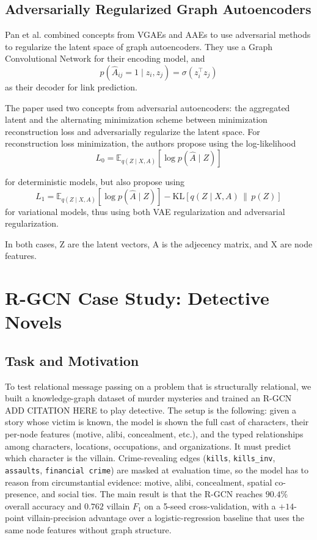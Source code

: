 \documentclass[11pt]{article}
\begin{document}
\subsection{Adversarially Regularized Graph Autoencoders}
Pan et al. combined concepts from VGAEs and AAEs to use adversarial methods to regularize the latent space of graph autoencoders. They use a Graph Convolutional Network for their encoding model, and 
\[
p\!\left(\hat{A}_{ij}=1 \mid z_i, z_j\right)
=
\sigma\!\left(z_i^\top z_j\right)
\]
as their decoder for link prediction.

The paper used two concepts from adversarial autoencoders: the aggregated latent and the alternating minimization scheme between minimization reconstruction loss and adversarially regularize the latent space. For reconstruction loss minimization, the authors propose using the log-likelihood
\[
L_0
=
\mathbb{E}_{q(Z \mid X,A)}
\left[
\log p(\hat{A}\mid Z)
\right]
\]

for deterministic models, but also propose using
\[
L_1
=
\mathbb{E}_{q(Z \mid X,A)}
\left[
\log p(\hat{A}\mid Z)
\right]
-
\mathrm{KL}
\left[
q(Z\mid X,A)
\,\|\, 
p(Z)
\right]
\]
for variational models, thus using both VAE regularization and adversarial regularization.

In both cases, Z are the latent vectors, A is the adjecency matrix, and X are node features.



\section{R-GCN Case Study: Detective Novels}
\label{sec:detective}

\subsection{Task and Motivation}
To test relational message passing on a problem that is structurally relational, we built a knowledge-graph dataset of murder mysteries and trained an R-GCN \cite{} ADD CITATION HERE to play detective. The setup is the following: given a story whose victim is known, the model is shown the full cast of characters, their per-node features (motive, alibi, concealment, etc.), and the typed relationships among characters, locations, occupations, and organizations. It must predict which character is the villain. Crime-revealing edges (\texttt{kills}, \texttt{kills\_inv}, \texttt{assaults}, \texttt{financial crime}) are masked at evaluation time, so the model has to reason from circumstantial evidence: motive, alibi, concealment, spatial co-presence, and social ties. The main result is that the R-GCN reaches $90.4\%$ overall accuracy and $0.762$ villain $F_1$ on a 5-seed cross-validation, with a $+14$-point villain-precision advantage over a logistic-regression baseline that uses the same node features without graph structure.
\end{document}
